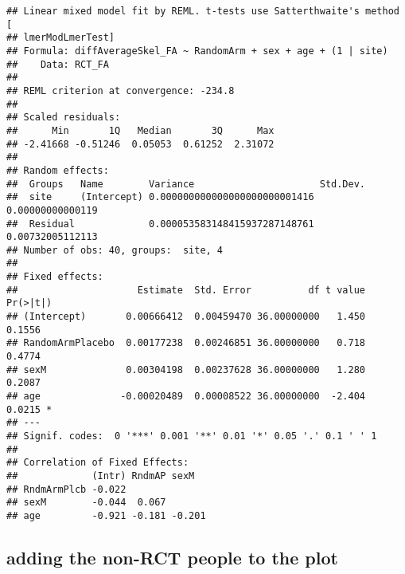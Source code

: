 \documentclass[]{article}
\theoremstyle{definition}
\theoremstyle{definition}
\theoremstyle{definition}
\theoremstyle{remark}
\begin{document}
\begin{verbatim}
## Linear mixed model fit by REML. t-tests use Satterthwaite's method [
## lmerModLmerTest]
## Formula: diffAverageSkel_FA ~ RandomArm + sex + age + (1 | site)
##    Data: RCT_FA
## 
## REML criterion at convergence: -234.8
## 
## Scaled residuals: 
##      Min       1Q   Median       3Q      Max 
## -2.41668 -0.51246  0.05053  0.61252  2.31072 
## 
## Random effects:
##  Groups   Name        Variance                      Std.Dev.        
##  site     (Intercept) 0.000000000000000000000001416 0.00000000000119
##  Residual             0.000053583148415937287148761 0.00732005112113
## Number of obs: 40, groups:  site, 4
## 
## Fixed effects:
##                     Estimate  Std. Error          df t value Pr(>|t|)  
## (Intercept)       0.00666412  0.00459470 36.00000000   1.450   0.1556  
## RandomArmPlacebo  0.00177238  0.00246851 36.00000000   0.718   0.4774  
## sexM              0.00304198  0.00237628 36.00000000   1.280   0.2087  
## age              -0.00020489  0.00008522 36.00000000  -2.404   0.0215 *
## ---
## Signif. codes:  0 '***' 0.001 '**' 0.01 '*' 0.05 '.' 0.1 ' ' 1
## 
## Correlation of Fixed Effects:
##             (Intr) RndmAP sexM  
## RndmArmPlcb -0.022              
## sexM        -0.044  0.067       
## age         -0.921 -0.181 -0.201
\end{verbatim}

\subsection{adding the non-RCT people to the
plot}\label{adding-the-non-rct-people-to-the-plot}
\end{document}
